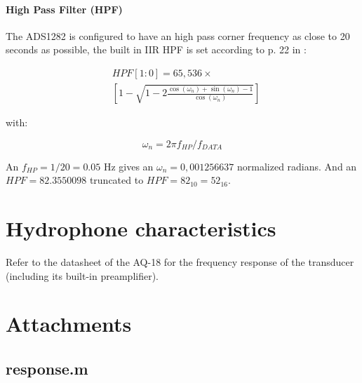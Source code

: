 \documentclass[a4paper]{article}
\begin{document}
\begin{multicols}{2}
\paragraph{High Pass Filter (HPF)} The ADS1282 is configured to have an high
pass corner frequency as close to 20 seconds as possible, the built in
IIR HPF is set according to p. 22 in :

\begin{equation}
  \begin{aligned}
    & HPF[1:0] = 65,536 \times \\
    & \left[ 1 - \sqrt{1 - 2 \frac{\cos (\omega_n) +
    \sin (\omega_n) - 1}{\cos
    (\omega_n)}}\right]
  \end{aligned}
  \label{eqn:hpf}
\end{equation}

with:

\begin{equation}
  \omega_n = 2 \pi f_{HP} / f_{DATA}
  \label{eqn:nat_freq}
\end{equation}

An $f_{HP} = 1/20 = 0.05 $ Hz gives an $\omega_n = 0,001256637$ normalized
radians. And an $HPF = 82.3550098$ truncated to $HPF = 82_{10} =
52_{16}$.

\section{Hydrophone characteristics}
Refer to the datasheet of the AQ-18 \cite{aq_18_ds} for the frequency response of the
transducer (including its built-in preamplifier).

\vspace{5em}
\printbibliography
\end{multicols}

\newpage
\section*{Attachments}
\subsection*{response.m}

\end{document}
